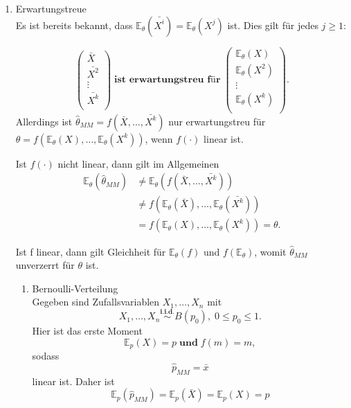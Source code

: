 \documentclass[10pt]{article}
\newcommand{\FZV}{X_1, \ldots, X_n} %
\newcommand{\EW}{\mathbb{E}} %
\newenvironment{BSP}[1][]
{\begin{Beispiel}[frametitle=#1]}{\end{Beispiel}}
\begin{document}
\begin{enumerate}
	\item Erwartungstreue\\
	Es ist bereits bekannt, dass $\EW_\theta(\bar{X^i})=\EW_\theta(X^j)$ ist. Dies gilt für jedes $j \geq 1$:
	
	\begin{equation*}
		\left(
		\begin{array}{c}
			\bar{X}\\
			\bar{X^2}\\
			\vdots\\
			\bar{X^k}\\
		\end{array}
		\right)\; \textbf{ist erwartungstreu für} \;
		\left(
		\begin{array}{c}
		 \EW_\theta(X)\\
		 \EW_\theta(X^2)\\
			\vdots\\
		 \EW_\theta(X^k) \\
		\end{array}
		\right).
	\end{equation*}
	 Allerdings ist $\hat{\theta}_{MM} = f(\bar{X}, \ldots, \bar{X^k})$ nur erwartungstreu für $\theta = f(\EW_\theta(X), \ldots, \EW_\theta(X^k))$, wenn $f(\cdot)$ linear ist. 
	 
	 Ist $f(\cdot)$ nicht linear, dann gilt im Allgemeinen
	 \begin{equation*}
	 	\begin{split}
	 	\EW_\theta(\hat{\theta}_{MM}) &\neq \EW_\theta(f(\bar{X}, \ldots, \bar{X^k}))\\
	 	&\neq f(\EW_\theta(\bar{X}),\ldots, \EW_\theta(\bar{X^k}))\\
	 	&= f(\EW_\theta({X}),\ldots, \EW_\theta({X^k})) =  \theta.
	 \end{split}
	 \end{equation*}
	
	Ist f linear, dann gilt Gleichheit für $\EW_{\theta}(f)$ und $f(\EW_{\theta})$, womit $\hat{\theta}_{MM}$ unverzerrt für $\theta$ ist.\\
	
	\begin{BSP}[Beispiel 1.3.3 (Erwartungstreue)]
			\begin{enumerate}[label = (\roman*)]
			\item Bernoulli-Verteilung\\
			Gegeben sind Zufallsvariablen $\FZV$ mit
			\begin{equation*}
				\FZV \overset{\textbf{i.i.d.}}{\sim} B(p_0), \; 0 \leq p_0 \leq 1.
			\end{equation*} 
			Hier ist das erste Moment
			\begin{equation*}
				\EW_p(X)=p \; \textbf{und} \; 	f(m)=m,
			\end{equation*}
			sodass
			\begin{equation*}
				\hat{p}_{MM} = \bar{x} 
			\end{equation*}
			linear ist. Daher ist 
			\begin{equation*}
				\EW_p(\hat{p}_{MM}) = \EW_p(\bar{X}) = \EW_p(X) = p
			\end{equation*}
			

\end{enumerate}
\end{BSP}
\end{enumerate}
\end{document}
